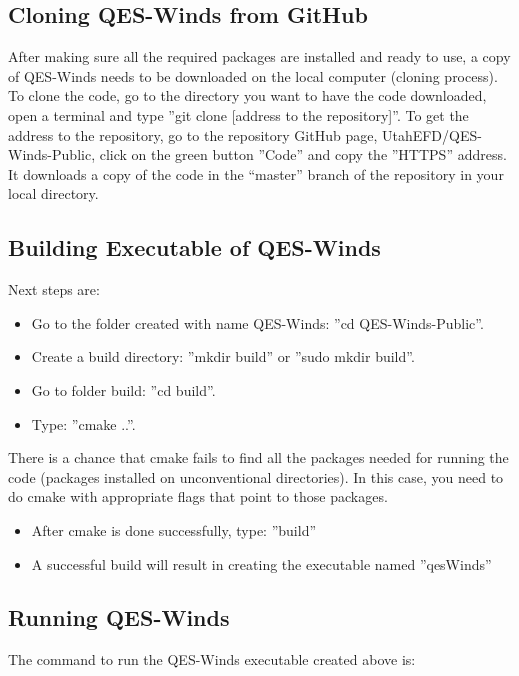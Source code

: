\subsection{Cloning QES-Winds from GitHub}

After making sure all the required packages are installed and ready to use, a copy of QES-Winds needs to be downloaded on the local computer (cloning process). To clone the code, go to the directory you want to have the code downloaded, open a terminal and type ''git clone [address to the repository]''. To get the address to the repository, go to the repository GitHub page, UtahEFD/QES-Winds-Public, click on the green button ''Code'' and copy the ''HTTPS'' address. It downloads a copy of the code in the “master” branch of the repository in your local directory.

\subsection{Building Executable of QES-Winds}

Next steps are:
\begin{itemize}
    \item Go to the folder created with name QES-Winds: ''cd QES-Winds-Public''.
    \item Create a build directory: ''mkdir build'' or ''sudo mkdir build''.
    \item Go to folder build: ''cd build''.
    \item Type: ''cmake ..''.
\end{itemize}

There is a chance that cmake fails to find all the packages needed for running the code (packages installed on unconventional directories). In this case, you need to do cmake with appropriate flags that point to those packages.

\begin{itemize}
    \item After cmake is done successfully, type: ''build''
    \item A successful build will result in creating the executable named ''qesWinds''
\end{itemize}


\subsection{Running QES-Winds}

The command to run the QES-Winds executable created above is:
\newline

